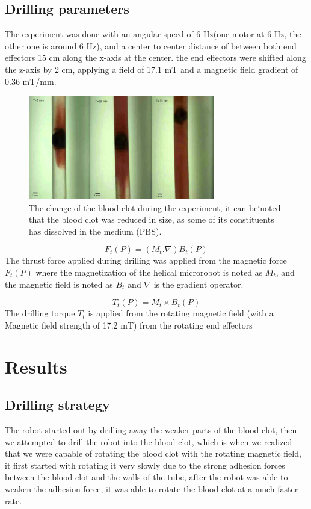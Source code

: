 \documentclass{MNR}
\begin{document}
\subsection*{Drilling parameters}
The experiment was done with an angular speed of 6 Hz(one motor at 6 Hz, the other one is around 6 Hz), and a center to center distance of between both end effectors 15 cm along the x-axis at the center. the end effectors were shifted along the z-axis by 2 cm, applying a field of 17.1 mT and a magnetic field gradient of 0.36 mT/mm.

\begin{figure}[t]
\centering
\includegraphics[width=3.2in]{13-7exp-edit}
\caption{The change of the blood clot during the experiment, it can be`noted that the blood clot was reduced in size, as some of its constituents has dissolved in the medium (PBS).  }\label{fig01:System}
\end{figure}

\begin{equation} 
F_t(P)=(M_t.\nabla)B_t(P)
\end{equation} 
The thrust force applied during drilling was applied from the magnetic force $F_t(P)$  where the magnetization of the helical microrobot is noted as $M_t$, and the magnetic field is noted as $B_t$ and $\nabla$ is the gradient operator.

\begin{equation} 
T_t(P)=M_t\times B_t(P)
\end{equation}
The drilling torque $T_t$ is applied from the rotating magnetic field (with a Magnetic field strength of 17.2 mT) from the rotating end effectors



\section*{Results}
\subsection*{Drilling strategy}
The robot started out by drilling away the weaker parts of the blood clot, then we attempted to drill the robot into the blood clot, which is when we realized that we were capable of rotating the blood clot with the rotating magnetic field, it first started with rotating it very slowly due to the strong adhesion forces between the blood clot and the walls of the tube, after the robot was able to weaken the adhesion force, it was able to rotate the blood clot at a much faster rate.
\end{document}
